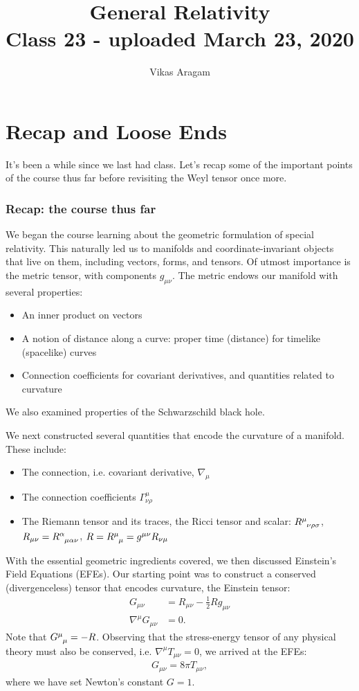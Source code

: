 \documentclass[10pt]{article}
\title{{\Huge General Relativity}\\{\Large{Class 23 - uploaded March 23, 2020}}} %
\author{Vikas Aragam}
\newcommand{\<}{\langle}
\renewcommand{\>}{\rangle}
\renewcommand{\(}{\left(}
\renewcommand{\)}{\right)}
\renewcommand{\[}{\left[}
\renewcommand{\]}{\right]}
\begin{document}
    \maketitle
    \flushbottom
    \newpage
    \pagestyle{fancynotes}
    \part{Recap and Loose Ends}
	It's been a while since we last had class. Let's recap some of the important points of the course thus far before revisiting the Weyl tensor once more.
		\section{Recap: the course thus far}
		We began the course learning about the geometric formulation of special relativity. This naturally led us to manifolds and coordinate-invariant objects that live on them, including vectors, forms, and tensors. Of utmost importance is the metric tensor, with components $g_{\mu\nu}$. The metric endows our manifold with several properties:
		\begin{itemize}
			\item An inner product on vectors
			\item A notion of distance along a curve: proper time (distance) for timelike (spacelike) curves
			\item Connection coefficients for covariant derivatives, and quantities related to curvature
		\end{itemize}
		We also examined properties of the Schwarzschild black hole.
	
		We next constructed several quantities that encode the curvature of a manifold. These include:
		\begin{itemize}
			\item The connection, i.e. covariant derivative, $\nabla_\mu$
			\item The connection coefficients $\Gamma^\mu_{\nu\rho}$
			\item The Riemann tensor and its traces, the Ricci tensor and scalar: $\tensor{R}{^\mu_\nu_\rho_\sigma}$, $R_{\mu\nu} = \tensor{R}{^\alpha_\mu_\alpha_\nu}$, $R = \tensor{R}{^\mu_\mu} = g^{\mu\nu} R_{\nu\mu}$
		\end{itemize}
		
		With the essential geometric ingredients covered, we then discussed Einstein's Field Equations (EFEs). Our starting point was to construct a conserved (divergenceless) tensor that encodes curvature, the Einstein tensor:
		\begin{align}
			G_{\mu\nu} &= R_{\mu\nu} - \frac{1}{2} R g_{\mu\nu} \\
			\nabla^\mu G_{\mu\nu} &= 0.
		\end{align}
		Note that $\tensor{G}{^\mu_\mu} = -R$. Observing that the stress-energy tensor of any physical theory must also be conserved, i.e. $\nabla^\mu T_{\mu\nu} = 0$, we arrived at the EFEs:
		\begin{align}
			G_{\mu\nu} = 8\pi T_{\mu\nu},
		\end{align}
		where we have set Newton's constant $G = 1$.
		
\end{document}
